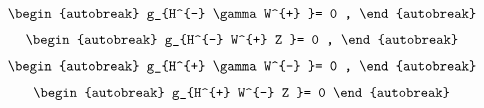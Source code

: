 \begin{align}
\begin{autobreak}
g_{H^{-} \gamma W^{+} }=
	0
	,
\end{autobreak}
\end{align}
\begin{align}
\begin{autobreak}
g_{H^{-} W^{+} Z }=
	0
	,
\end{autobreak}
\end{align}
\begin{align}
\begin{autobreak}
g_{H^{+} \gamma W^{-} }=
	0
	,
\end{autobreak}
\end{align}
\begin{align}
\begin{autobreak}
g_{H^{+} W^{-} Z }=
	0
	
\end{autobreak}
\end{align}
